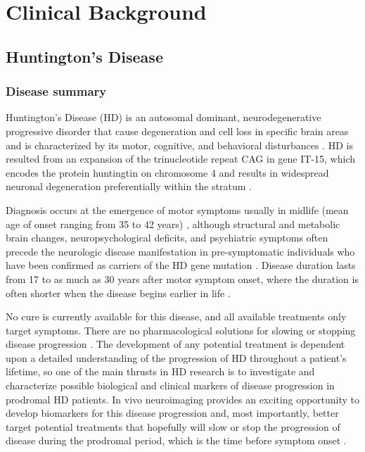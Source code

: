 \section{Clinical Background}
\label{clinicalBackground}

\subsection{Huntington's Disease}

\subsubsection{Disease summary}

\noindent Huntington's Disease (HD) is an autosomal dominant, neurodegenerative progressive disorder that cause degeneration and cell loss in specific brain areas and is characterized by its motor, cognitive, and behavioral disturbances \cite{PREDICTHD}. HD is resulted from an expansion of the trinucleotide repeat CAG in gene IT-15, which encodes the protein huntingtin on chromosome 4 \cite{Huntington1993} and results in widespread neuronal degeneration preferentially within the stratum \cite{Montoya2006}.

Diagnosis occurs at the emergence of motor symptoms usually in midlife (mean age of onset ranging from 35 to 42 years) \cite{Martin1986}, although structural and metabolic brain changes, neuropsychological deficits, and psychiatric symptoms often precede the neurologic disease manifestation in pre-symptomatic individuals who have been confirmed as carriers of the HD gene mutation \cite{Paulsen2001, Campodonico1998, Aylward2000, Harris1999}. Disease duration lasts from 17 to as much as 30 years after motor symptom onset, where the duration is often shorter when the disease begins earlier in life \cite{Martin1986, Gomez-Tortosa2001}.

No cure is currently available for this disease, and all available treatments only target symptoms. There are no pharmacological solutions for slowing or stopping disease progression \cite{Frank2010}. The development of any potential treatment is dependent upon a detailed understanding of the progression of HD throughout a patient's lifetime, so one of the main thrusts in HD research is to investigate and characterize possible biological and clinical markers of disease progression in prodromal HD patients. In vivo neuroimaging provides an exciting opportunity to develop biomarkers for this disease progression and, most importantly, better target potential treatments that hopefully will slow or stop the progression of disease during the prodromal period, which is the time before symptom onset \cite{Paulsen2008}.
\newline

